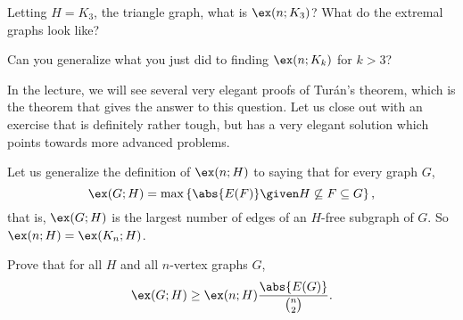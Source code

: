 \documentclass[nobib]{tufte-handout}
\begin{document}
\begin{xca}
  Letting $H = K_3$, the triangle graph, what is $\ex(n; K_3)$? What do the extremal graphs look like?
\end{xca}

\begin{xca}
  Can you generalize what you just did to finding $\ex(n; K_k)$ for $k > 3$?
\end{xca}

In the lecture, we will see several very elegant proofs of Turán's theorem, which is the theorem that gives the answer to this question. Let us close out with an exercise that is definitely rather tough, but has a very elegant solution which points towards more advanced problems.

\begin{xca}
  Let us generalize the definition of $\ex(n; H)$ to saying that for every graph $G$,
  $$\ex(G; H) = \max\left\{\abs{E(F)} \given H \not\subseteq F \subseteq G\right\},$$
  that is, $\ex(G;H)$ is the largest number of edges of an $H$-free subgraph of $G$. So $\ex(n; H) = \ex(K_n; H)$.

  Prove that for all $H$ and all $n$-vertex graphs $G$,
  $$\ex(G; H) \geq \ex(n; H) \frac{\abs{E(G)}}{\binom{n}{2}}.$$
\end{xca}

%
%
\end{document}
